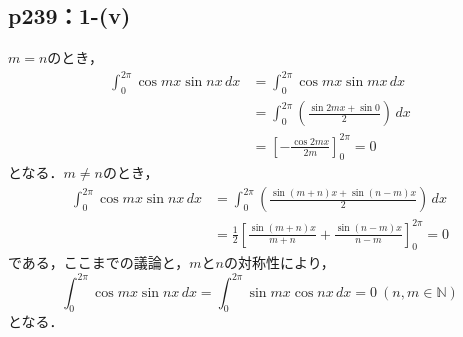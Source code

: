 \documentclass[a4paper,10pt,fleqn]{ltjsarticle}
\begin{document}
\subsection*{p239：1-(v)}

	\begin{screen}
		$m=n$のとき，
		\begin{align*}
			\int_{0}^{2\pi} \cos m x \sin nx \, dx & = \int_{0}^{2\pi} \cos mx \sin mx \, dx \\
			& = \int_{0}^{2\pi} \left (\frac{\sin 2mx + \sin 0}{2}\right ) \, dx \\
			& = \left [-\frac{\cos 2mx}{2m}\right ]_{0}^{2\pi} =0
		\end{align*}
		となる．$m \ne n$のとき，
		\begin{align*}
			\int_{0}^{2\pi} \cos mx \sin nx \, dx & = \int_{0}^{2\pi} \left (\frac{\sin (m+n)x + \sin (n-m)x}{2}\right) \, dx \\
			& = \frac{1}{2}\left [\frac{\sin (m+n)x}{m+n}+\frac{\sin (n-m)x}{n-m} \right]_{0}^{2\pi} =0
		\end{align*}
		である，ここまでの議論と，$m$と$n$の対称性により，
			\[
				\int_{0}^{2\pi} \cos mx \sin nx \, dx =\int_{0}^{2\pi} \sin mx \cos nx \, dx =0 ~(n,m \in \mathbb{N})
			\]
		となる．
	\end{screen}
\end{document}
